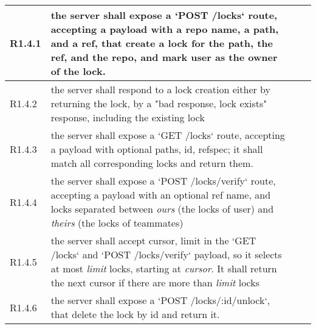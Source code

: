 \begin{landscape}
\begin{longtable}{|p{1cm}|p{19cm}|p{2cm}|p{3cm}|}
        R1.4.1                              & the server shall expose a `POST /locks` route, accepting a payload with a repo name, a path, and a ref, that create a lock for the path, the ref, and the repo, and mark user as the owner of the lock.                                                                               &                       &                                          \\\hline
        R1.4.2                              & the server shall respond to a lock creation either by returning the lock, by a "bad response, lock exists" response, including the existing lock                                                                                                                                      &                       &                                          \\\hline
        R1.4.3                              & the server shall expose a `GET /locks` route, accepting a payload with optional paths, id, refspec; it shall match all corresponding locks and return them.                                                                                                                           &                       &                                          \\\hline
        R1.4.4                              & the server shall expose a `POST /locks/verify` route, accepting a payload with an optional ref name, and locks separated between \textit{ours} (the locks of user) and \textit{theirs} (the locks of teammates)                                                                       &                       &                                          \\\hline
        R1.4.5                              & the server shall accept cursor, limit in the `GET /locks` and `POST /locks/verify` payload, so it selects at most \textit{limit} locks, starting at \textit{cursor}. It shall return the next cursor if there are more than \textit{limit} locks                                      &                       &                                          \\\hline
        R1.4.6                              & the server shall expose a `POST /locks/:id/unlock`, that delete the lock by id and return it.                                                                                                                                                                                         &                       &                                          \\\hline

\end{longtable}
\end{landscape}
